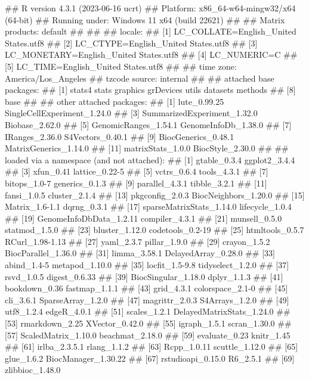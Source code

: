 \documentclass[]{article}
\renewenvironment{verbatim}{\color{codecolor}\begin{myshaded}\begin{oldverbatim}}{\end{oldverbatim}\end{myshaded}}
\begin{document}
\begin{verbatim}
## R version 4.3.1 (2023-06-16 ucrt)
## Platform: x86_64-w64-mingw32/x64 (64-bit)
## Running under: Windows 11 x64 (build 22621)
## 
## Matrix products: default
## 
## 
## locale:
## [1] LC_COLLATE=English_United States.utf8 
## [2] LC_CTYPE=English_United States.utf8   
## [3] LC_MONETARY=English_United States.utf8
## [4] LC_NUMERIC=C                          
## [5] LC_TIME=English_United States.utf8    
## 
## time zone: America/Los_Angeles
## tzcode source: internal
## 
## attached base packages:
## [1] stats4    stats     graphics  grDevices utils     datasets  methods  
## [8] base     
## 
## other attached packages:
##  [1] lute_0.99.25                SingleCellExperiment_1.24.0
##  [3] SummarizedExperiment_1.32.0 Biobase_2.62.0             
##  [5] GenomicRanges_1.54.1        GenomeInfoDb_1.38.0        
##  [7] IRanges_2.36.0              S4Vectors_0.40.1           
##  [9] BiocGenerics_0.48.1         MatrixGenerics_1.14.0      
## [11] matrixStats_1.0.0           BiocStyle_2.30.0           
## 
## loaded via a namespace (and not attached):
##  [1] gtable_0.3.4              ggplot2_3.4.4            
##  [3] xfun_0.41                 lattice_0.22-5           
##  [5] vctrs_0.6.4               tools_4.3.1              
##  [7] bitops_1.0-7              generics_0.1.3           
##  [9] parallel_4.3.1            tibble_3.2.1             
## [11] fansi_1.0.5               cluster_2.1.4            
## [13] pkgconfig_2.0.3           BiocNeighbors_1.20.0     
## [15] Matrix_1.6-1.1            dqrng_0.3.1              
## [17] sparseMatrixStats_1.14.0  lifecycle_1.0.4          
## [19] GenomeInfoDbData_1.2.11   compiler_4.3.1           
## [21] munsell_0.5.0             statmod_1.5.0            
## [23] bluster_1.12.0            codetools_0.2-19         
## [25] htmltools_0.5.7           RCurl_1.98-1.13          
## [27] yaml_2.3.7                pillar_1.9.0             
## [29] crayon_1.5.2              BiocParallel_1.36.0      
## [31] limma_3.58.1              DelayedArray_0.28.0      
## [33] abind_1.4-5               metapod_1.10.0           
## [35] locfit_1.5-9.8            tidyselect_1.2.0         
## [37] rsvd_1.0.5                digest_0.6.33            
## [39] BiocSingular_1.18.0       dplyr_1.1.3              
## [41] bookdown_0.36             fastmap_1.1.1            
## [43] grid_4.3.1                colorspace_2.1-0         
## [45] cli_3.6.1                 SparseArray_1.2.0        
## [47] magrittr_2.0.3            S4Arrays_1.2.0           
## [49] utf8_1.2.4                edgeR_4.0.1              
## [51] scales_1.2.1              DelayedMatrixStats_1.24.0
## [53] rmarkdown_2.25            XVector_0.42.0           
## [55] igraph_1.5.1              scran_1.30.0             
## [57] ScaledMatrix_1.10.0       beachmat_2.18.0          
## [59] evaluate_0.23             knitr_1.45               
## [61] irlba_2.3.5.1             rlang_1.1.2              
## [63] Rcpp_1.0.11               scuttle_1.12.0           
## [65] glue_1.6.2                BiocManager_1.30.22      
## [67] rstudioapi_0.15.0         R6_2.5.1                 
## [69] zlibbioc_1.48.0
\end{verbatim}
\end{document}
